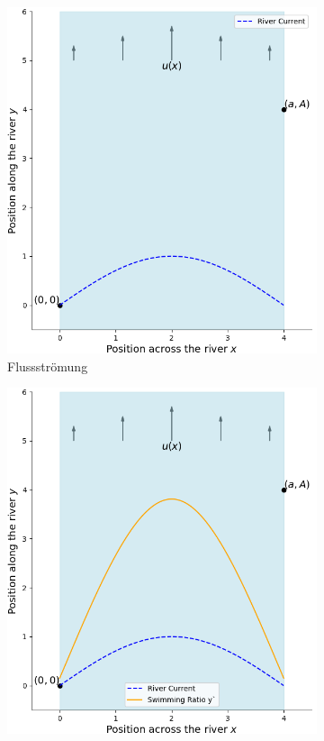 \begin{figure}
    \centering
    \begin{subfigure}{0.48\textwidth}
        \centering
        \includegraphics[width=\textwidth]{papers/schwimmen/Grafiken/Figure_2-crop.png}	
        \caption{Flussströmung}
        \label{fig:no_velocity}
    \end{subfigure}
    \hfill  
    \begin{subfigure}{0.48\textwidth}
        \centering
        \includegraphics[width=\textwidth]{papers/schwimmen/Grafiken/Figure_3-crop.png}	

\end{subfigure}
\end{figure}
